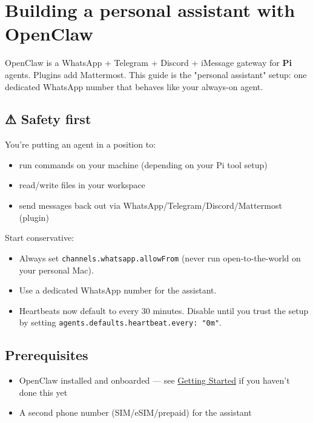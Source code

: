 \clearpage

\section{Building a personal assistant with OpenClaw}


OpenClaw is a WhatsApp + Telegram + Discord + iMessage gateway for \textbf{Pi} agents. Plugins add Mattermost. This guide is the "personal assistant" setup: one dedicated WhatsApp number that behaves like your always-on agent.

\subsection{⚠ Safety first}


You’re putting an agent in a position to:

\begin{itemize}
  \item run commands on your machine (depending on your Pi tool setup)
  \item read/write files in your workspace
  \item send messages back out via WhatsApp/Telegram/Discord/Mattermost (plugin)
\end{itemize}


Start conservative:

\begin{itemize}
  \item Always set \texttt{channels.whatsapp.allowFrom} (never run open-to-the-world on your personal Mac).
  \item Use a dedicated WhatsApp number for the assistant.
  \item Heartbeats now default to every 30 minutes. Disable until you trust the setup by setting \texttt{agents.defaults.heartbeat.every: "0m"}.
\end{itemize}


\subsection{Prerequisites}


\begin{itemize}
  \item OpenClaw installed and onboarded — see \href{/start/getting-started}{Getting Started} if you haven't done this yet
  \item A second phone number (SIM/eSIM/prepaid) for the assistant
\end{itemize}


